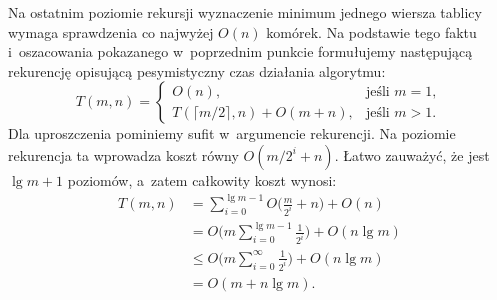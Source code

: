 \subproblem %
Na ostatnim poziomie rekursji wyznaczenie minimum jednego wiersza tablicy wymaga sprawdzenia co najwyżej $O(n)$ komórek.
Na podstawie tego faktu i~oszacowania pokazanego w~poprzednim punkcie formułujemy następującą rekurencję opisującą pesymistyczny czas działania algorytmu:
\[
	T(m,n) =
	\begin{cases}
		O(n), & \text{jeśli $m=1$}, \\
		T(\lceil m/2\rceil,n)+O(m+n), & \text{jeśli $m>1$}.
	\end{cases}
\]
Dla uproszczenia pominiemy sufit w~argumencie rekurencji.
Na  poziomie rekurencja ta wprowadza koszt równy $O(m/2^i+n)$.
Łatwo zauważyć, że jest $\lg m+1$ poziomów, a~zatem całkowity koszt wynosi:
\begin{align*}
	T(m,n) &= \sum_{i=0}^{\lg m-1}O\biggl(\frac{m}{2^i}+n\biggr)+O(n) \\
	&= O\biggl(m\sum_{i=0}^{\lg m-1}\frac{1}{2^i}\biggr)+O(n\lg m) \\
	&\le O\biggl(m\sum_{i=0}^\infty\frac{1}{2^i}\biggr)+O(n\lg m) \\[1mm]
	&= O(m+n\lg m).
\end{align*}

